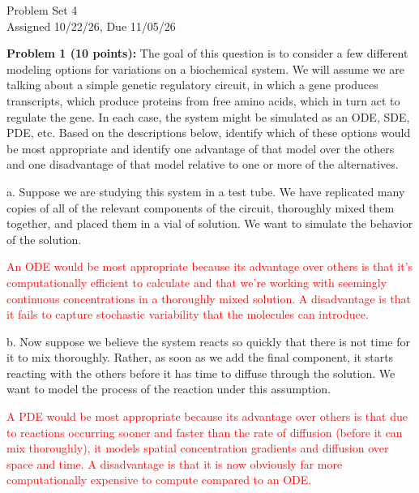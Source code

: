 \documentclass[11pt]{article}
\begin{document}


\newcommand{\hide}[1]{#1}

\newcommand{\hideg}[1]{}

\begin{center}
{\huge Problem Set 4}\\
Assigned 10/22/26, Due 11/05/26
\end{center}

\setlength{\parindent}{0in}

{\bf Problem 1 (10 points):}  The goal of this question is to consider a few different modeling options for variations on a biochemical system.  We will assume we are talking about a simple genetic regulatory circuit, in which a gene produces transcripts, which produce proteins from free amino acids, which in turn act to regulate the gene.  In each case, the system might be simulated as an ODE, SDE, PDE, etc.  Based on the descriptions below, identify which of these options would be most appropriate and identify one advantage of that model over the others and one disadvantage of that model relative to one or more of the alternatives.

a. Suppose we are studying this system in a test tube.  We have replicated many copies of all of the relevant components of the circuit, thoroughly mixed them together, and placed them in a vial of solution.  We want to simulate the behavior of the solution.

\textcolor{red}{
An ODE would be most appropriate because its advantage over others is that it's computationally efficient to calculate and that we're working with seemingly continuous concentrations in a thoroughly mixed solution. A disadvantage is that it fails to capture stochastic variability that the molecules can introduce.
}

b. Now suppose we believe the system reacts so quickly that there is not time for it to mix thoroughly.  Rather, as soon as we add the final component, it starts reacting with the others before it has time to diffuse through the solution.  We want to model the process of the reaction under this assumption.

\textcolor{red}{
A PDE would be most appropriate because its advantage over others is that due to reactions occurring sooner and faster than the rate of diffusion (before it can mix thoroughly), it models spatial concentration gradients and diffusion over space and time. A disadvantage is that it is now obviously far more computationally expensive to compute compared to an ODE.
}
\end{document}
